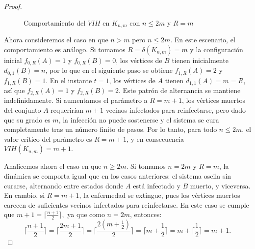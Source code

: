 \documentclass[12pt,titlepage,twoside,openright]{book}
\begin{document}
\begin{proof}
\begin{figure}[h]
    \caption{Comportamiento del $VIH$ en $K_{n,m}$ con $n\leq2m$ y $R=m$}
    \label{KnmyR=m,n<=2m}
    \end{figure}

    Ahora consideremos el caso en que $n>m$ pero $n\leq 2m$. En este escenario, el comportamiento es an\'alogo. Si tomamos $R=\delta(K_{n,m})=m$ y la configuraci\'on inicial $f_{0,R}(A)=1$ y $f_{0,R}(B)=0$, los v\'ertices de $B$ tienen inicialmente $d_{0,1}(B)=n$, por lo que en el siguiente paso se obtiene $f_{1,R}(A)=2$ y $f_{1,R}(B)=1$. En el instante $t=1$, los v\'ertices de $A$ tienen $d_{1,1}(A)=m=R$, as\'i que $f_{2,R}(A)=1$ y $f_{2,R}(B)=2$. Este patr\'on de alternancia se mantiene indefinidamente. Si aumentamos el par\'ametro a $R=m+1$, los v\'ertices muertos del conjunto $A$ requerir\'ian $m+1$ vecinos infectados para reinfectarse, pero dado que su grado es $m$, la infecci\'on no puede sostenerse y el sistema se cura completamente tras un n\'umero finito de pasos. Por lo tanto, para todo $n\leq 2m$, el valor cr\'itico del par\'ametro es $R=m+1$, y en consecuencia $VIH(K_{n,m})=m+1$.

    Analicemos ahora el caso en que $n \geq 2m$. Si tomamos $n=2m$ y $R=m$, la din\'amica se comporta igual que en los casos anteriores: el sistema oscila sin curarse, alternando entre estados donde $A$ est\'a infectado y $B$ muerto, y viceversa. En cambio, si $R=m+1$, la enfermedad se extingue, pues los v\'ertices muertos carecen de suficientes vecinos infectados para reinfectarse. En este caso se cumple que $m+1 = \lceil \tfrac{n+1}{2}\rceil,$ ya que como $n=2m$, entonces: $$\lceil \frac{n+1}{2} \rceil=\lceil \frac{2m+1}{2} \rceil = \lceil \frac{2(m+\frac{1}{2})}{2} \rceil=\lceil m+\frac{1}{2} \rceil= m+\lceil \frac{1}{2} \rceil=m+1.$$


\end{proof}
\end{document}
